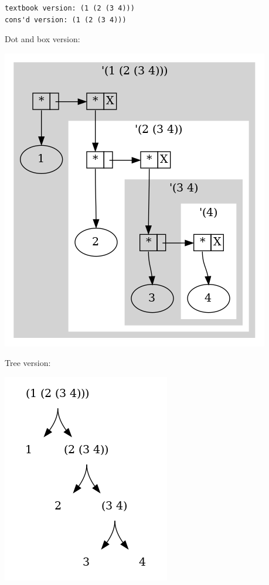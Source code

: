 \documentclass[final,fleqn,titlepage,twoside]{article}
\begin{document}
\begin{verbatim}
textbook version: (1 (2 (3 4))) 
cons'd version: (1 (2 (3 4))) 
\end{verbatim}

Dot and box version:
\begin{center}
\includegraphics[width=.9\linewidth]{2/fig/24-dotandbox.png}
\end{center}

Tree version:
\begin{center}
\includegraphics[width=.9\linewidth]{2/fig/24-tree.png}
\end{center}
\end{document}
